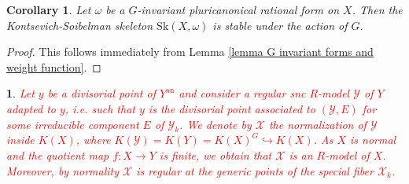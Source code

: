 \documentclass{amsart}%
\numberwithin{equation}{subsection}
\theoremstyle{plain2}
\newtheorem{cor}[equation]{Corollary}
\theoremstyle{definition2}
\theoremstyle{stepstyle}
\theoremstyle{point}
\theoremstyle{subpoint}
\newtheorem{subpoint}[equation]{}%
\newcommand{\spa}[1]{\begin{subpoint}#1\end{subpoint}}           %
\newcommand{\cX}{\ensuremath{\mathscr{X}}}
\newcommand{\cY}{\ensuremath{\mathscr{Y}}}
\renewcommand{\cY}{\ensuremath{\mathscr{Y}}}
\newcommand{\an}{\mathrm{an}}
\newcommand{\Sk}{\mathrm{Sk}}
\begin{document}
\begin{cor} \label{cor:G inv forms and KS}
Let $\omega$ be a $G$-invariant pluricanonical rational form on $X$. Then the Kontsevich-Soibelman skeleton $\Sk(X,\omega)$ is stable under the action of $G$.
\end{cor}
\begin{proof}
This follows immediately from Lemma \ref{lemma G invariant forms and weight function}.
\end{proof}

\spa{\label{par divisorial repre quotient} \textcolor{red}{Let $y$ be a divisorial point of $Y^\an$ and consider a regular snc $R$-model $\cY$ of $Y$ adapted to $y$, i.e. such that $y$ is the divisorial point associated to $(\cY, E)$ for some irreducible component $E$ of $\cY_k$. We denote by $\cX$ the normalization of $\cY$ inside $K(X) $, where $K(\cY)=K(Y)=K(X)^{G} \hookrightarrow K(X)$. As $X$ is normal and the quotient map $f:X \rightarrow Y$ is finite, we obtain that $\cX$ is an $R$-model of $X$. Moreover, by normality $\cX$ is regular at the generic points of the special fiber $\cX_k$.}}
\end{document}
